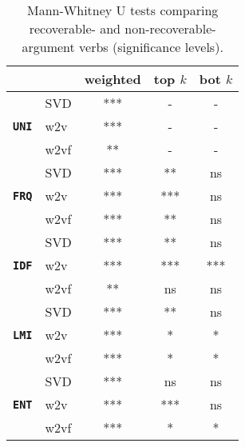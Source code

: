 \begin{table}
\caption{Mann-Whitney U tests comparing recoverable- and non-recoverable-argument verbs (significance levels).}
\centering
\begin{small}
\begin{tabular}{llccc}
\hline & & \textbf{weighted} & \textbf{top $k$} & \textbf{bot $k$} \\ \hline
 & SVD & *** & - & - \\
\texttt{\textbf{UNI}} & w2v & *** & - & - \\
 & w2vf & ** & - & - \\
 \hline
 & SVD & *** & ** & ns \\
\texttt{\textbf{FRQ}} & w2v & *** & *** & ns \\
 & w2vf & *** & ** & ns \\
 \hline
 & SVD & *** & ** & ns \\
\texttt{\textbf{IDF}} & w2v & *** & *** & *** \\
 & w2vf & ** & ns & ns \\
 \hline
 & SVD & *** & ** & ns \\
\texttt{\textbf{LMI}} & w2v & *** & * & * \\
 & w2vf & *** & * & * \\
 \hline
 & SVD & *** & ns & ns \\
\texttt{\textbf{ENT}} & w2v & *** & *** & ns \\
 & w2vf & *** & * & * \\
\hline
\end{tabular}
\end{small}
\end{table}

